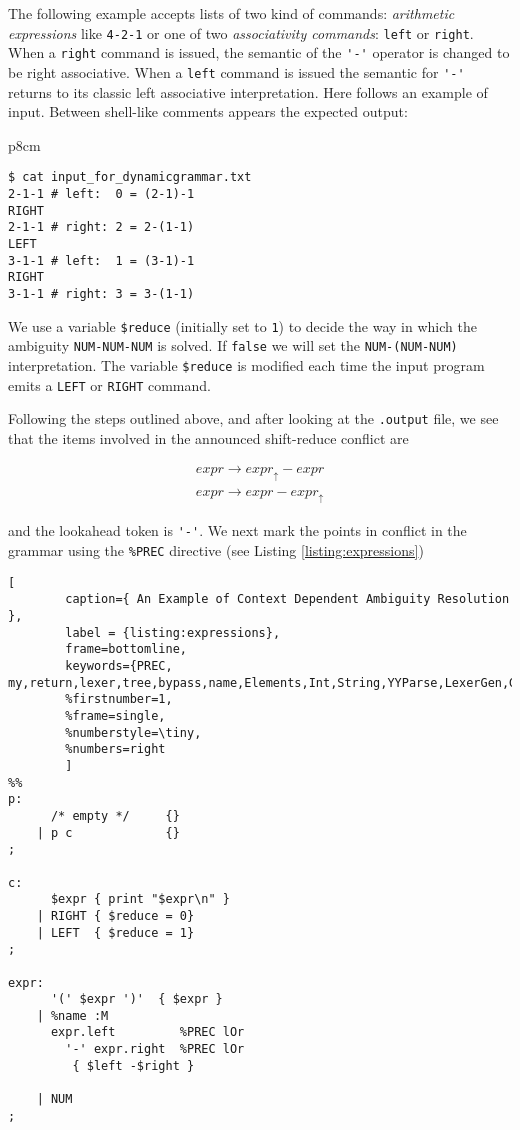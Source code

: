 The following
example
accepts lists of two kind of commands:
{\it arithmetic expressions} like \verb|4-2-1| or one of two {\it associativity commands}:
\verb|left| or  \verb|right|. When a \verb|right| command is issued, the semantic of the
\verb|'-'| operator is changed to be right associative. When a \verb|left| command is issued
the semantic for \verb|'-'| returns to its classic left associative interpretation.
Here follows an example of input. Between shell-like comments appears the expected output:
\begin{center}
\begin{tabular}{p{8cm}}
\begin{verbatim}
$ cat input_for_dynamicgrammar.txt 
2-1-1 # left:  0 = (2-1)-1
RIGHT
2-1-1 # right: 2 = 2-(1-1)
LEFT
3-1-1 # left:  1 = (3-1)-1
RIGHT
3-1-1 # right: 3 = 3-(1-1)
\end{verbatim}
\end{tabular}
\end{center}
We use a variable \verb|$reduce| (initially set to \verb|1|)
to decide the way in which the ambiguity
\verb|NUM-NUM-NUM| is solved. If \verb|false| we will set the \verb|NUM-(NUM-NUM)|
interpretation. The variable \verb|$reduce|
is modified each time the input program emits a \verb|LEFT| or
\verb|RIGHT| command.

Following the steps outlined above,
and after looking at the \verb|.output| file, we see
that the items involved in the announced shift-reduce conflict are

\begin{eqnarray*}
expr \rightarrow expr_\uparrow - expr \\
expr \rightarrow expr - expr_\uparrow 
\end{eqnarray*}

\noindent and the lookahead token is \verb|'-'|.
We next mark the points in conflict in the grammar using
the \verb|%PREC| directive (see Listing \ref{listing:expressions})
\begin{lstlisting}[
        caption={ An Example of Context Dependent Ambiguity Resolution },
        label = {listing:expressions},
        frame=bottomline,
        keywords={PREC, my,return,lexer,tree,bypass,name,Elements,Int,String,YYParse,LexerGen,Gen},
        %firstnumber=1, 
        %frame=single,
        %numberstyle=\tiny,
        %numbers=right
        ]
%%
p:  
      /* empty */     {}
    | p c             {}
;

c:
      $expr { print "$expr\n" }
    | RIGHT { $reduce = 0}
    | LEFT  { $reduce = 1}
;

expr: 
      '(' $expr ')'  { $expr } 
    | %name :M
      expr.left         %PREC lOr
        '-' expr.right  %PREC lOr
         { $left -$right }

    | NUM
;
\end{lstlisting}


